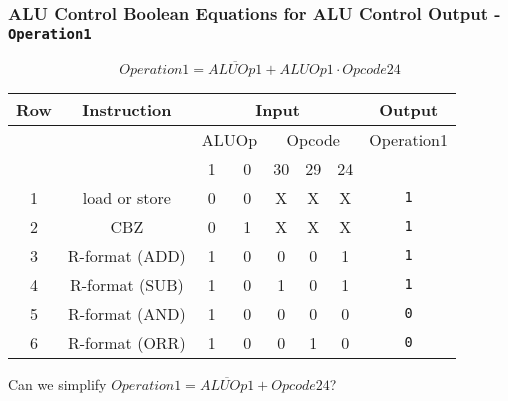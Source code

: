 \begin{frame}[fragile]\frametitle{ALU Control Boolean Equations for ALU Control Output - \texttt{Operation1}}
$$Operation1= \overline{ALUOp1} + ALUOp1 \cdot Opcode24$$
\begin{center}
{\small
\begin{tabular}{c|c|cc|ccc|c}
Row&Instruction   &  \multicolumn{5}{|c|}{Input} & \multicolumn{1}{|c}{Output}\\\hline
     &         & \multicolumn{2}{|c|}{ALUOp} &  \multicolumn{3}{|c|}{Opcode} & Operation1\\
& & 1 & 0 & 30 & 29 & 24 & \\\hline
1&load or store & 0 & 0 &  X & X & X & \texttt{1}\\
2&CBZ           & 0 & 1 &  X & X & X & \texttt{1}\\
3&R-format (ADD)& 1 & 0 &  0 & 0 & 1 & \texttt{1}\\
4&R-format (SUB)& 1 & 0 &  1 & 0 & 1 & \texttt{1}\\
5&R-format (AND)& 1 & 0 &  0 & 0 & 0 & \texttt{0}\\
6&R-format (ORR)& 1 & 0 &  0 & 1 & 0 & \texttt{0}\\
\end{tabular}
}
\end{center}
\begin{tcolorbox}[enhanced,attach boxed title to top center={yshift=-3mm,yshifttext=-1mm},
  colback=blue!5!white,colframe=blue!75!black,colbacktitle=blue!80!black,
  title=Think About It,fonttitle=\bfseries,
  boxed title style={size=small,colframe=red!50!black} ]
  Can we simplify $Operation1= \overline{ALUOp1} + Opcode24$? 

  \ifnum{}\fi
  \end{tcolorbox}

\end{frame}

